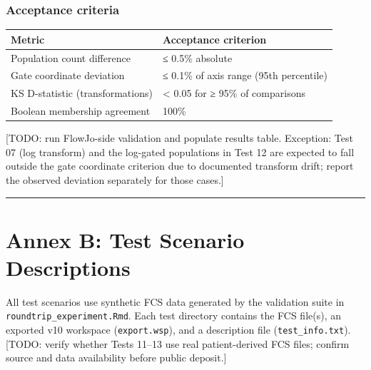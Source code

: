 \documentclass[
]{article}
\begin{document}
\subsubsection{Acceptance criteria}\label{acceptance-criteria}

\begin{longtable}[]{@{}ll@{}}
\toprule\noalign{}
Metric & Acceptance criterion \\
\midrule\noalign{}
\endhead
\bottomrule\noalign{}
\endlastfoot
Population count difference & ≤ 0.5\% absolute \\
Gate coordinate deviation & ≤ 0.1\% of axis range (95th percentile) \\
KS D-statistic (transformations) & \textless{} 0.05 for ≥ 95\% of
comparisons \\
Boolean membership agreement & 100\% \\
\end{longtable}

\textcolor{pending}{[TODO: run FlowJo-side validation and populate results table. Exception: Test 07 (log transform) and the log-gated populations in Test 12 are expected to fall outside the gate coordinate criterion due to documented transform drift; report the observed deviation separately for those cases.]}

\begin{center}\rule{0.5\linewidth}{0.5pt}\end{center}

\newpage

\section{Annex B: Test Scenario
Descriptions}\label{annex-b-test-scenario-descriptions}

All test scenarios use synthetic FCS data generated by the validation
suite in \texttt{roundtrip\_experiment.Rmd}. Each test directory
contains the FCS file(s), an exported v10 workspace
(\texttt{export.wsp}), and a description file (\texttt{test\_info.txt}).
\textcolor{pending}{[TODO: verify whether Tests 11–13 use real patient-derived FCS files; confirm source and data availability before public deposit.]}
\end{document}
